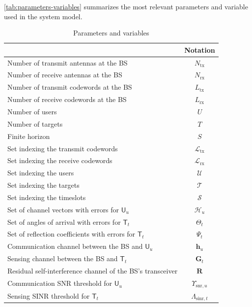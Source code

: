 \documentclass[10pt,journal,compsoc]{IEEEtran}
\theoremstyle{myremark}
\theoremstyle{myexample}
\begin{document}
\begin{appendices}
\cref{tab:parameters-variables} summarizes the most relevant parameters and variable used in the system model.
\begin{table}[H]
 \centering
	\scriptsize
	\caption{Parameters and variables}
	\begin{tabular}{|m{6.7cm} |c|}
		\hline
		\centering {\bf Parameters and Variables} & \bf Notation	\\ 
		\hline
		Number of transmit antennas at the BS  		& $ N_\mathrm{tx} $ \\ 
		Number of receive antennas at the BS  		& $ N_\mathrm{rx} $ \\ 
		Number of transmit codewords at the BS		& $ L_\mathrm{tx} $ \\ 
		Number of receive codewords at the BS		& $ L_\mathrm{rx} $ \\ 
		Number of users										& $ U $ \\
		Number of targets									& $ T $ \\
		Finite horizon									& $ S $ \\
		Set indexing the transmit codewords 			& $ \mathcal{L}_\mathrm{tx} $ \\
		Set indexing the receive codewords 			& $ \mathcal{L}_\mathrm{rx} $ \\
		Set indexing the users  						& $ \mathcal{U} $ \\
		Set indexing the targets 					& $ \mathcal{T} $ \\
		Set indexing the timeslots 						& $ \mathcal{S} $ \\
		Set of channel vectors with errors for $ \mathsf{U}_u $ 			& $ \mathcal{H}_u $ \\
		Set of angles of arrival with errors for $ \mathsf{T}_t $ & $ \Theta_t $ \\
		Set of reflection coefficients with errors for $ \mathsf{T}_t $ & $ \Psi_t $ \\
		Communication channel between the BS and $ \mathsf{U}_u $  			& $ \mathbf{h}_u $ \\
		Sensing channel between the BS and $ \mathsf{T}_t $ 	    	& $ \mathbf{G}_t $ \\
		Residual self-interference channel of the BS's transceiver   	& $ \mathbf{R} $ \\
		Communication SNR threshold for $ \mathsf{U}_u $			& $ \Upsilon_{\mathrm{snr},u} $ \\
		Sensing SINR threshold for $ \mathsf{T}_t $						& $ \Lambda_{\mathrm{sinr},t} $ \\

\end{tabular}
\end{table}
\end{appendices}
\end{document}
